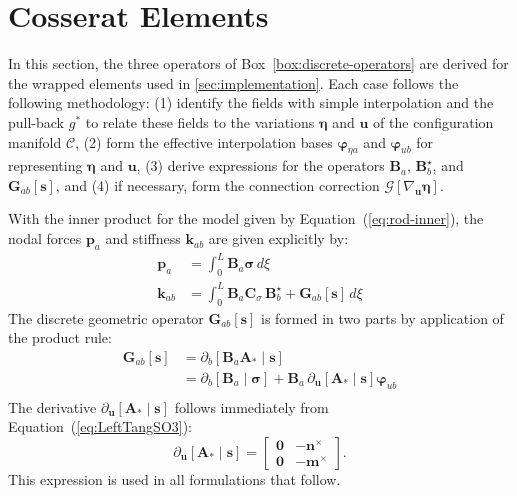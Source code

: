 \hypertarget{sec:elements}{%
\section{Cosserat Elements}\label{sec:cosserat-elements}}

In this section, the three operators of Box~\ref{box:discrete-operators} are derived for the
wrapped elements used in \cref{sec:implementation}.
Each case follows the following methodology:
(1) identify the fields with simple interpolation and the pull-back \(g^*\) to relate these fields to the variations \(\bm{\eta}\) and \(\bm{u}\) of the configuration manifold
\(\mathscr{C}\), (2) form the effective interpolation bases
\(\bm{\varphi}_{\eta a}\) and \(\bm{\varphi}_{u b}\) for representing
\(\bm{\eta}\) and \(\bm{u}\), (3) derive expressions for
the operators \(\bm{B}_a\), \(\bm{B}^\star_b\), and
\(\bm{G}_{a b}[\bm{s}]\), and (4) if necessary, form the connection
correction \(\mathcal{G}[\nabla_{\bm{u}}\bm{\eta}]\).

With the inner product for the model given by Equation~(\ref{eq:rod-inner}), the
nodal forces \(\bm{p}_a\) and stiffness \(\mathbf{k}_{a b}\) are given
explicitly by: 
%
\begin{equation*} 
\begin{aligned}
\bm{p}_a &= \int_0^L \bm{B}_a\bm{\sigma} \,d \xi \\
\mathbf{k}_{a b} &= \int_0^L \bm{B}_a \bm{C}_\sigma \, \bm{B}^\star_b  
 +  \bm{G}_{a b}[\bm{s}] \, d \xi
\end{aligned}
\end{equation*}
The discrete geometric operator \(\bm{G}_{ab}[\bm{s}]\) is formed in
two parts by application of the product rule: %
\begin{equation} 
\begin{aligned}
\bm{G}_{ab}[\bm{s}] &= \partial_b[\bm{B}_a\bm{A}_*\mid\bm{s}] \\
&= \partial_b[\bm{B}_a\mid\bm{\sigma}] + \bm{B}_a \, \partial_{\bm{u}} [\bm{A}_*\mid\bm{s}] \bm{\varphi}_{u b} \\
%
%
\end{aligned}
\label{eq:geom-terms}
\end{equation}
%
The derivative \(\partial_{\bm{u}} [\bm{A}_*\mid\bm{s}]\) follows immediately from Equation~(\ref{eq:LeftTangSO3}): 
%
\begin{equation*} 
\partial_{\bm{u}} [\bm{A}_*\mid\bm{s}]
=\begin{bmatrix}
\mathbf{0} & -\bm{n}^{\times} \\
\mathbf{0} & -\bm{m}^{\times}
\end{bmatrix}.
\end{equation*}
This expression is used in all formulations that follow.

